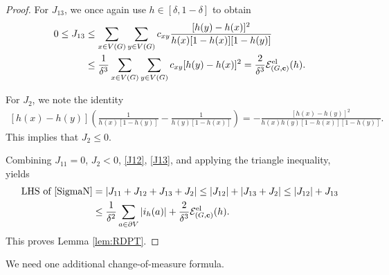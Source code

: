 \documentclass[11pt]{amsart}
\theoremstyle{plain}
\theoremstyle{definition}
\theoremstyle{remark}
\begin{document}
\begin{proof}
For $J_{13}$, we once again use $h\in [\delta,1-\delta]$ to obtain
\begin{align}
\label{J13}
0\leq J_{13} &\leq \sum_{x\in V(G)} \sum_{y\in V(G)} c_{xy} \frac{[h(y)-h(x)]^2}{h(x)[1-h(x)][1-h(y)]} \\ 
\nonumber &\leq \frac{1}{\delta^3} \sum_{x\in V(G)}\sum_{y\in V(G)} c_{xy} [h(y)-h(x)]^2 = \frac{2}{\delta^3} \mathcal{E}^{\rm el}_{(G,{\bf c})}(h).
\end{align}

For $J_2$, we note the identity
\begin{align*}
\left[h(x)-h(y)\right]\left(\frac{1}{h(x)[1-h(y)]} - \frac{1}{h(y)[1-h(x)]}\right) = - \frac{[h(x)-h(y)]^2}{h(x)h(y)[1-h(x)][1-h(y)]}.
\end{align*}
This implies that $J_2\leq 0$.

Combining $J_{11}=0$, $J_2<0$, \eqref{J12}, \eqref{J13}, and applying the triangle inequality, yields
\begin{align*}
\text{LHS of \eqref{SigmaN}} &= |J_{11} + J_{12}+ J_{13}+ J_2| \leq |J_{12}| + |J_{13}+J_2| \leq |J_{12}|+J_{13}\\
& \leq \frac{1}{\delta^2} \sum_{a\in \partial V}|i_h(a)| + \frac{2}{\delta^3} \mathcal{E}^{\rm el}_{(G,{\bf c})}(h).
\end{align*}
This proves Lemma \ref{lem:RDPT}.
\end{proof}

We need one additional change-of-measure formula.
\end{document}
